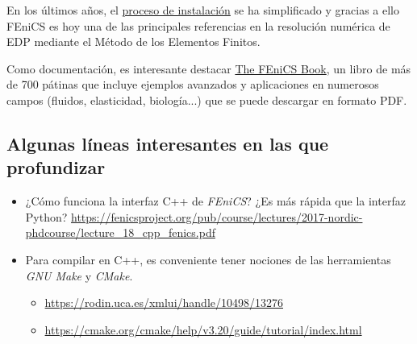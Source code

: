 En los últimos años, el
\href{https://fenicsproject.org/download/}{proceso de instalación} se
ha simplificado y gracias a ello FEniCS es hoy una de las principales
referencias en la resolución numérica de EDP mediante el Método de los
Elementos Finitos.

Como documentación, es interesante destacar
\href{https://fenicsproject.org/book/}{The FEniCS Book}, un libro de
más de 700 pátinas que incluye ejemplos avanzados y aplicaciones en
numerosos campos (fluidos, elasticidad, biología...) que se puede
descargar en formato PDF.



\subsection{Algunas líneas interesantes en las que profundizar}
\label{sec:01:profundizar}

\begin{itemize}
\item ¿Cómo funciona la interfaz C++ de \textit{FEniCS}? ¿Es más rápida que la interfaz Python? \url{https://fenicsproject.org/pub/course/lectures/2017-nordic-phdcourse/lecture_18_cpp_fenics.pdf}

\item Para compilar en C++, es conveniente tener nociones de las herramientas \textit{GNU Make} y \textit{CMake}.
  \begin{itemize}
  \item \url{https://rodin.uca.es/xmlui/handle/10498/13276}
  \item \url{https://cmake.org/cmake/help/v3.20/guide/tutorial/index.html}
  \end{itemize}
\end{itemize}

